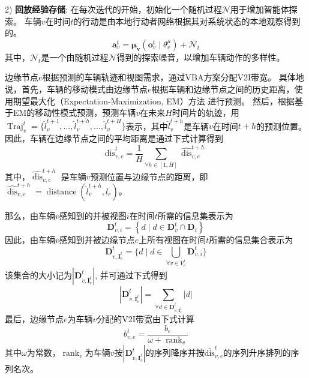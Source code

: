 2) \textbf{回放经验存储}:
在每次迭代的开始，初始化一个随机过程$\mathcal{N}$用于增加智能体探索。
车辆$v$在时间$t$的行动是由本地行动者网络根据其对系统状态的本地观察得到的。
\begin{equation}
	\boldsymbol{a}_{v}^{t}=\boldsymbol{\mu}_{\boldsymbol{v}}\left(\boldsymbol{o}_{v}^{t} \mid \theta_{v}^{\mu}\right)+\mathcal{N}_{t}
\end{equation}
\noindent 其中，$\mathcal{N}_{t}$是一个由随机过程$\mathcal{N}$得到的探索噪音，以增加车辆动作的多样性。

边缘节点$e$根据预测的车辆轨迹和视图需求，通过VBA方案分配V2I带宽。
具体地说，首先，车辆的移动模式由边缘节点$e$根据车辆和边缘节点之间的历史距离，使用期望最大化（Expectation-Maximization, EM）方法\cite{hofmann2001unsupervised} 进行预测。
然后，根据基于EM的移动性模式预测，预测车辆$v$在未来$H$时间片的轨迹，用$\operatorname{Traj}_{v}^{t} = \{ \hat{l}_{v}^{t+1}, \dots, \hat{l}_{v}^{t+h}, \dots, \hat{l}_{v}^{t+H}\}$表示，其中$\hat{l}_{v}^{t+h}$是车辆$v$在时间$t+h$的预测位置。
因此，车辆在边缘节点之间的平均距离是通过下式计算得到
\begin{equation}
	\operatorname{\bar{dis}}_{v, e}^{t} = \frac{1}{H} {\sum_{\forall h \in [1, H]} \widehat{\operatorname{dis}}_{v, e}^{t+h}}
\end{equation}
其中，$\widehat{\operatorname{dis}}_{v, e}^{t+h}$ 是车辆$v$预测位置与边缘节点的距离，即$\widehat{\operatorname{dis}}_{v, e}^{t+h}=\operatorname{distance}(\hat{l}_{v}^{t+h}, l_{e})$。

那么，由车辆$v$感知到的并被视图$i$在时间$t$所需的信息集表示为 
\begin{equation}
	\mathbf{D}_{v, i}^{t} = \left\{ d \mid  d \in \mathbf{D}_{v}^t \cap  \mathbf{D}_i \right\}
\end{equation}
因此，由车辆$v$感知到并被边缘节点$e$上所有视图在时间$t$所需的信息集合表示为 
\begin{equation}
	\mathbf{D}_{v, {\mathbf{I}_e^t}}^{t} = \{ d \mid  d \in \bigcup_{\forall v \in V_e^t} \mathbf{D}_{v, i}^{t}\}
\end{equation}
\noindent 该集合的大小记为$|\mathbf{D}_{v, {\mathbf{I}_e^t}}^{t}|$, 并可通过下式得到
\begin{equation}
	|\mathbf{D}_{v, {\mathbf{I}_e^t}}^{t}| = \sum_{\forall d \in \mathbf{D}_{v, {\mathbf{I}_e^t}}^{t}}|d|
\end{equation}
最后，边缘节点$e$为车辆$v$分配的V2I带宽由下式计算 
\begin{equation}
	b_{v, e}^{t} =\frac{b_{e}} {\omega+\operatorname{rank}_{v}}
\end{equation}
\noindent 其中$\omega$为常数，$\operatorname{rank}_{v}$为车辆$v$按$| \mathbf{D}_{v, {\mathbf{I}_e^t}}^{t}|$的序列降序并按$\operatorname{\bar{dis}}_{v, e}^{t}$的序列升序排列的序列名次。

